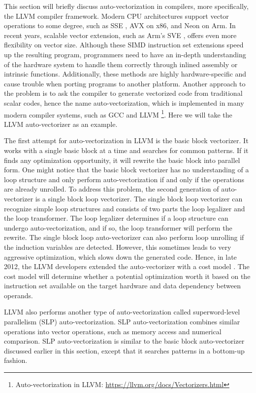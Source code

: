 This section will briefly discuss auto-vectorization in compilers, more specifically, the LLVM compiler framework. Modern CPU architectures support vector operations to some degree, such as SSE \cite{sse-intel}, AVX \cite{avx-intel} on x86, and Neon \cite{arm-neon} on Arm. In recent years, scalable vector extension, such as Arm's SVE \cite{arm-sve}, offers even more flexibility on vector size. Although these SIMD instruction set extensions speed up the resulting program, programmers need to have an in-depth understanding of the hardware system to handle them correctly through inlined assembly or intrinsic functions. Additionally, these methods are highly hardware-specific and cause trouble when porting programs to another platform. Another approach to the problem is to ask the compiler to generate vectorized code from traditional scalar codes, hence the name auto-vectorization, which is implemented in many modern compiler systems, such as GCC \cite{auto-vec-gcc} and LLVM \footnote{Auto-vectorization in LLVM: \url{https://llvm.org/docs/Vectorizers.html}}. Here we will take the LLVM auto-vectorizer as an example.

The first attempt for auto-vectorization in LLVM is the basic block vectorizer. It works with a single basic block at a time and searches for common patterns. If it finds any optimization opportunity, it will rewrite the basic block into parallel form. One might notice that the basic block vectorizer has no understanding of a loop structure and only perform auto-vectorization if and only if the operations are already unrolled. To address this problem, the second generation of auto-vectorizer is a single block loop vectorizer. The single block loop vectorizer can recognize simple loop structures and consists of two parts the loop legalizer and the loop transformer. The loop legalizer determines if a loop structure can undergo auto-vectorization, and if so, the loop transformer will perform the rewrite. The single block loop auto-vectorizer can also perform loop unrolling if the induction variables are detected. However, this sometimes leads to very aggressive optimization, which slows down the generated code. Hence, in late 2012, the LLVM developers extended the auto-vectorizer with a cost model \cite{llvm-vec-cost, llvm-vec-cost-avx}. The cost model will determine whether a potential optimization worth it based on the instruction set available on the target hardware and data dependency between operands.  

LLVM also performs another type of auto-vectorization called superword-level parallelism (SLP) auto-vectorization. SLP auto-vectorization combines similar operations into vector operations, such as memory access and numerical comparison. SLP auto-vectorization is similar to the basic block auto-vectorizer discussed earlier in this section, except that it searches patterns in a bottom-up fashion. 

